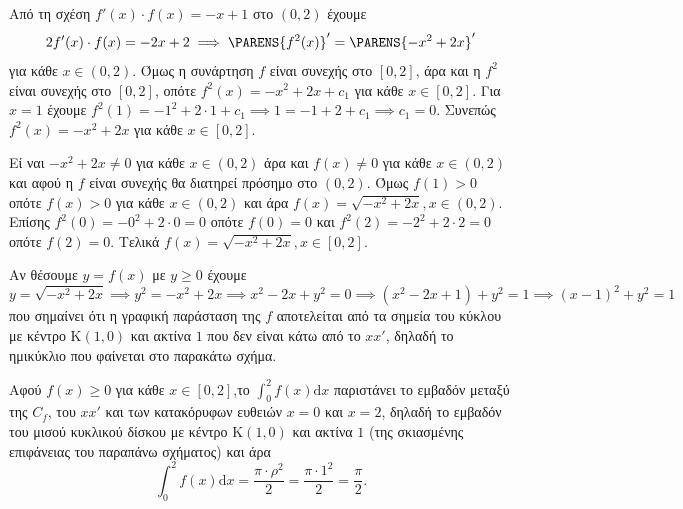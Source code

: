 \begin{alist}
\item Από τη σχέση $f'(x) \cdot f(x) = -x+1$ στο $(0,2)$ έχουμε
\[
    2f'(x) \cdot f(x) = -2x+2 \implies \PARENS{f^2(x)}' = \PARENS{-x^2+2x}'
\]
για κάθε $x \in (0,2)$. Όμως η συνάρτηση $f$ είναι συνεχής στο $[0,2]$, άρα και η $f^2$ είναι συνεχής στο $[0,2]$, οπότε $f^2(x) = -x^2+2x+c_1$ για κάθε $x \in [0,2]$.
Για $x=1$ έχουμε $f^2(1) = -1^2+2 \cdot 1+c_1 \implies 1 = -1+2+c_1 \implies c_1=0$.
Συνεπώς $f^2(x) = -x^2+2x$ για κάθε $x \in [0,2]$.

\item Εί ναι $-x^2+2x \ne 0$ για κάθε $x \in (0,2)$ άρα και $f(x) \ne 0$ για κάθε $x \in (0,2)$ και αφού η $f$ είναι συνεχής θα διατηρεί πρόσημο στο $(0,2)$. Όμως $f(1)>0$ οπότε $f(x)>0$ για κάθε $x \in (0,2)$ και άρα $f(x) = \sqrt{-x^2+2x}, x \in (0,2)$.
Επίσης $f^2(0) = -0^2+2 \cdot 0 = 0$ οπότε $f(0)=0$ και $f^2(2) = -2^2+2 \cdot 2 = 0$ οπότε $f(2)=0$. Τελικά $f(x) = \sqrt{-x^2+2x}, x \in [0,2]$.

\item Αν θέσουμε $y=f(x)$ με $y \ge 0$ έχουμε
\[
    y = \sqrt{-x^2+2x} \implies y^2 = -x^2+2x \implies x^2-2x+y^2 = 0 \implies (x^2-2x+1)+y^2 = 1 \implies (x-1)^2+y^2=1
\]
που σημαίνει ότι η γραφική παράσταση της $f$ αποτελείται από τα σημεία του κύκλου με κέντρο $\mathrm{K}(1,0)$ και ακτίνα $1$ που δεν είναι κάτω από το $xx'$, δηλαδή το ημικύκλιο που φαίνεται στο παρακάτω σχήμα.

\item Αφού $f(x) \ge 0$ για κάθε $x \in [0,2]$,το $\int_0^2 f(x)\mathrm{d}x$ παριστάνει το εμβαδόν μεταξύ της $C_f$, του $xx'$ και των κατακόρυφων ευθειών $x=0$ και $x=2$, δηλαδή το εμβαδόν του μισού κυκλικού δίσκου με κέντρο $\mathrm{K}(1,0)$ και ακτίνα $1$ (της σκιασμένης επιφάνειας του παραπάνω σχήματος) και άρα
\[
    \int_0^2 f(x)\mathrm{d}x = \frac{\pi \cdot \rho^2}{2} = \frac{\pi \cdot 1^2}{2} = \frac{\pi}{2}.
\]
\end{alist}
